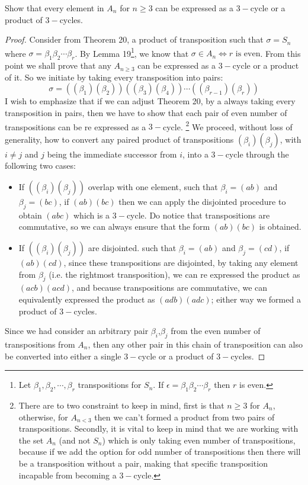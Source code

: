 \begin{assignment}[
  header=HeaderA,
  body=BodyA,
  title={Homework 3},
  duedate={26 February, 2026},
  toc=false,
  toctitle={This appears on the Table of contents.},
  exlist=false
]
\begin{exer}[Problem 5.60]
Show that every element in $A_n$ for $n\geq 3$ can be expressed as a $3-$cycle or a product of $3-$cycles.    
\begin{proof}
Consider from Theorem 20, a product of transposition such that $\sigma = S_n$ where $\sigma = \beta_1\beta_2\cdots \beta_r$. By Lemma 19\footnote{Let $\beta_1,\beta_2,\cdots, \beta_r$ transpositions for $S_n$. If $\epsilon = \beta_1\beta_2\cdots \beta_r$ then $r$ is even.}, we know that $\sigma \in A_n \iff r \text{ is even}$. From this point we shall prove that any $A_{n\geq 3}$ can be expressed as a $3-$cycle or a product of it. So we initiate by taking every transposition into pairs:
\[
\sigma = ((\beta_1)(\beta_2))((\beta_3)(\beta_4))\cdots((\beta_{r-1})(\beta_r))
\]
I wish to emphasize that if we can adjust Theorem 20, by a always taking every transposition in pairs, then we have to show that each pair of even number of transpositions can be re expressed as a $3-$cycle. \footnote{There are to two constraint to keep in mind, first is that $n\geq 3$ for $A_n$, otherwise, for $A_{n<3}$ then we can't formed a product from two pairs of transpositions. Secondly, it is vital to keep in mind that we are working with the set $A_n$ (and not $S_n$) which is only taking even number of transpositions, because if we add the option for odd number of transpositions then there will be a transposition without a pair, making that specific transposition incapable from becoming a $3-$cycle.} We proceed, without loss of generality, how to convert any paired product of transpositions $(\beta_i)(\beta_j)$, with $i\neq j$ and $j$ being the immediate successor from $i$, into a $3-$cycle through the following two cases:\\
\begin{itemize}
    \item[Case 1:]  If $((\beta_i)(\beta_j))$ overlap with one element, such that $\beta_i =(ab)$ and $\beta_j = (bc)$, if $(ab)(bc)$ then we can apply the disjointed procedure to obtain $(abc)$ which is a $3-$cycle. Do notice that transpositions are commutative, so we can always ensure that the form $(ab)(bc)$ is obtained.  
    \item[Case 2:] If $((\beta_i)(\beta_j))$ are disjointed. such that $\beta_i = (ab)$ and $\beta_j = (cd)$, if $(ab)(cd)$, since these transpositions are disjointed, by taking any element from $\beta_j$ (i.e. the rightmost transposition), we can re expressed the product as $(acb)(acd)$, and because transpositions are commutative, we can equivalently expressed the product as $(adb)(adc)$; either way we formed a product of $3-$cycles.
\end{itemize}
Since we had consider an arbitrary pair $\beta_i$,$\beta_j$ from the even number of transpositions from $A_n$, then any other pair in this chain of transposition can also be converted into either a single $3-$cycle or a product of $3-$cycles.
\end{proof}
\end{exer}


\end{assignment}
